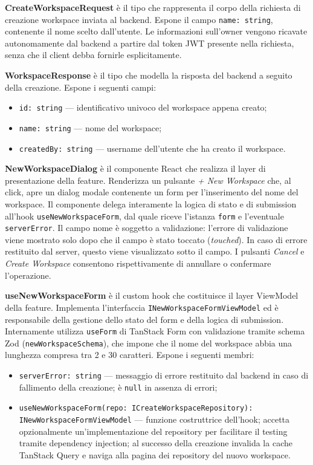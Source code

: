 \documentclass[a4paper, 11pt]{article}
\newcounter{subsubsubsection}[subsubsection]
\newcounter{subsubsubsubsection}[subsubsubsection]
\begin{document}

\textbf{CreateWorkspaceRequest} è il tipo che rappresenta il corpo della richiesta di creazione
workspace inviata al backend. Espone il campo \texttt{name: string}, contenente il nome scelto
dall'utente. Le informazioni sull'owner vengono ricavate autonomamente dal backend a partire dal
token JWT presente nella richiesta, senza che il client debba fornirle esplicitamente.

\textbf{WorkspaceResponse} è il tipo che modella la risposta del backend a seguito della creazione.
Espone i seguenti campi:
\begin{itemize}
  \item \texttt{id: string} — identificativo univoco del workspace appena creato;
  \item \texttt{name: string} — nome del workspace;
  \item \texttt{createdBy: string} — username dell'utente che ha creato il workspace.
\end{itemize}


\textbf{NewWorkspaceDialog} è il componente React che realizza il layer di presentazione della
feature. Renderizza un pulsante \textit{+ New Workspace} che, al click, apre un dialog modale
contenente un form per l'inserimento del nome del workspace. Il componente delega interamente la
logica di stato e di submission all'hook \texttt{useNewWorkspaceForm}, dal quale riceve l'istanza
\texttt{form} e l'eventuale \texttt{serverError}. Il campo nome è soggetto a validazione: l'errore
di validazione viene mostrato solo dopo che il campo è stato toccato (\textit{touched}). In caso di
errore restituito dal server, questo viene visualizzato sotto il campo. I pulsanti \textit{Cancel}
e \textit{Create Workspace} consentono rispettivamente di annullare o confermare l'operazione.


\textbf{useNewWorkspaceForm} è il custom hook che costituisce il layer ViewModel della feature.
Implementa l'interfaccia \texttt{INewWorkspaceFormViewModel} ed è responsabile della gestione dello
stato del form e della logica di submission. Internamente utilizza \texttt{useForm} di
TanStack Form con validazione tramite schema Zod (\texttt{newWorkspaceSchema}), che impone che il
nome del workspace abbia una lunghezza compresa tra 2 e 30 caratteri. Espone i seguenti membri:
\begin{itemize}
  \item \texttt{serverError: string} — messaggio di errore restituito dal backend in caso di
        fallimento della creazione; è \texttt{null} in assenza di errori;
  \item \texttt{useNewWorkspaceForm(repo: ICreateWorkspaceRepository): INewWorkspaceFormViewModel}
        — funzione costruttrice dell'hook; accetta opzionalmente un'implementazione del repository
        per facilitare il testing tramite dependency injection; al successo della creazione
        invalida la cache TanStack Query e naviga alla pagina dei repository del nuovo workspace.
\end{itemize}
\end{document}
